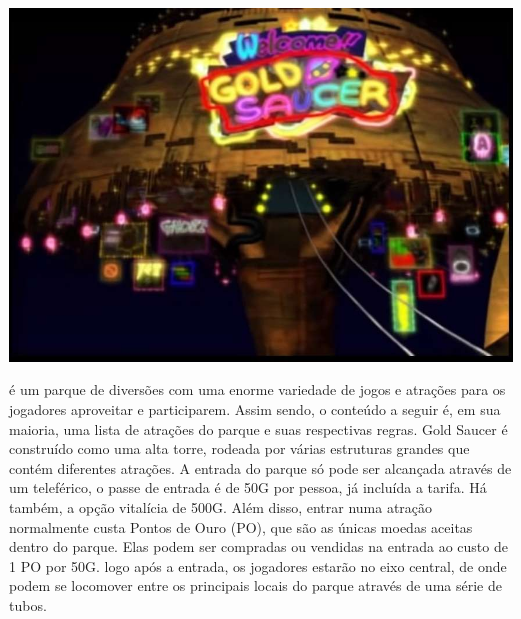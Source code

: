 %
%
\begin{center} \includegraphics[width=\columnwidth]{./art/goldsaucer/goldsaucer.jpg} \end{center}
%
\vfill
%
 é um parque de diversões com uma enorme variedade de jogos e atrações para os jogadores aproveitar e participarem. 
Assim sendo, o conteúdo a seguir é, em sua maioria, uma lista de atrações do parque e suas respectivas regras.
Gold Saucer é construído como uma alta torre, rodeada por várias estruturas grandes que contém diferentes atrações.
A entrada do parque só pode ser alcançada através de um teleférico, o passe de entrada é de 50G por pessoa, já incluída a tarifa.
Há também, a opção vitalícia de 500G. Além disso, entrar numa atração normalmente custa Pontos de Ouro (PO), que são as únicas moedas aceitas dentro do parque.
Elas podem ser compradas ou vendidas na entrada ao custo de 1 PO por 50G.
logo após a entrada, os jogadores estarão no eixo central, de onde podem se locomover entre os principais locais do parque através de uma série de tubos.
%
\vfill
%
